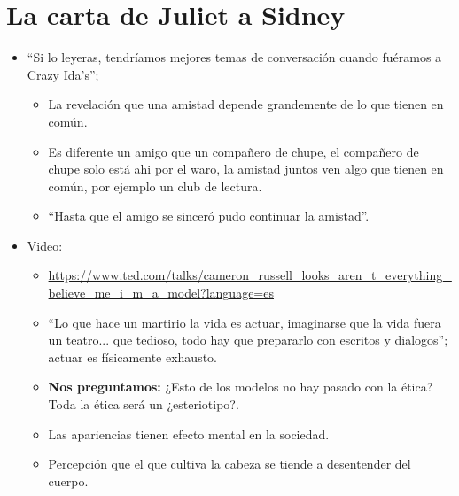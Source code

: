 \section{La carta de Juliet a Sidney}
\begin{itemize}
    \item ``Si lo leyeras, tendríamos mejores temas de conversación cuando fuéramos a Crazy Ida's''; 
        \begin{itemize}
            \item La revelación que una amistad depende grandemente de lo que tienen en común.
            \item Es diferente un amigo que un compañero de chupe, el compañero de chupe solo está ahi por el waro, la amistad juntos ven algo que tienen en común, por ejemplo un club de lectura.
            \item ``Hasta que el amigo se sinceró pudo continuar la amistad''.
        \end{itemize}
    
    \item Video:
        \begin{itemize}
            \item \url{https://www.ted.com/talks/cameron_russell_looks_aren_t_everything_believe_me_i_m_a_model?language=es}
            \item ``Lo que hace un martirio la vida es actuar, imaginarse que la vida fuera un teatro... que tedioso, todo hay que prepararlo con escritos y dialogos''; actuar es físicamente exhausto.
            \item \textbf{Nos preguntamos:} ¿Esto de los modelos no hay pasado con la ética? Toda la ética será un ¿esteriotipo?.
            \item Las apariencias tienen efecto mental en la sociedad.
            \item Percepción que el que cultiva la cabeza se tiende a desentender del cuerpo.
        \end{itemize}
\end{itemize}
